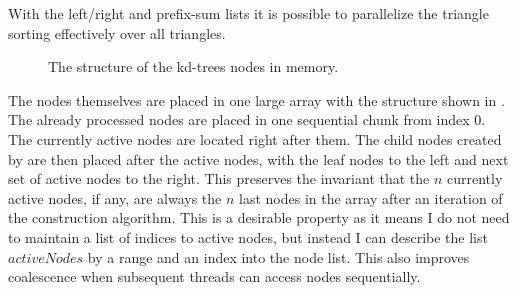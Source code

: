With the left/right and prefix-sum lists it is possible to parallelize the
triangle sorting effectively over all triangles.


\begin{figure}
  \centering
  \caption{The structure of the kd-trees nodes in memory.}
  \label{fig:nodeStructure}
\end{figure}

The nodes themselves are placed in one large array with the structure
shown in . The already processed nodes are
placed in one sequential chunk from index 0. The currently active
nodes are located right after them. The child nodes created by
 are then placed after the active
nodes, with the leaf nodes to the left and next set of active nodes to
the right. This preserves the invariant that the $n$ currently active
nodes, if any, are always the $n$ last nodes in the array after an
iteration of the construction algorithm. This is a desirable property
as it means I do not need to maintain a list of indices to active
nodes, but instead I can describe the list $activeNodes$ by a range
and an index into the node list. This also improves coalescence when
subsequent threads can access nodes sequentially.


